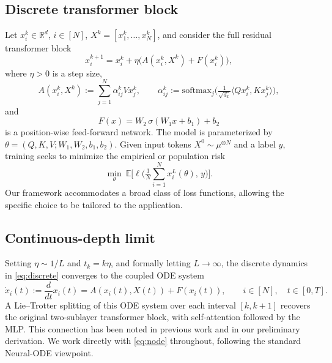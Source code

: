\documentclass[11pt,a4wide]{article}
\theoremstyle{definition}
\newcommand{\R}{\mathbb{R}}
\begin{document}
\subsection{Discrete transformer block}
Let $x_i^k\in\R^d$, $i\in[N]$, $X^k = [x_1^k,\dots,x_N^k]$, and consider the full residual transformer block
\begin{equation}
x_i^{k+1} = x_i^k + \eta\big(A(x_i^k,X^k) + F(x_i^k)\big),
\label{eq:discrete}
\end{equation}
where $\eta>0$ is a step size,
\begin{equation}
A(x_i^k,X^k) := \sum_{j=1}^N \alpha_{ij}^k V x_j^k, \qquad
\alpha_{ij}^k := \mathrm{softmax}_j\Big(\tfrac{1}{\sqrt{d_k}}\langle Qx_i^k, Kx_j^k\rangle\Big),
\label{eq:attn-discrete}
\end{equation}
and
\begin{equation}
F(x) = W_2\,\sigma(W_1 x + b_1) + b_2
\label{eq:ffn}
\end{equation}
is a position-wise feed-forward network. The model is parameterized by $\theta = (Q,K,V;W_1,W_2,b_1,b_2)$. Given input tokens $X^0\sim\mu^{\otimes N}$ and a label $y$, training seeks to minimize the empirical or population risk
\begin{equation}
\min_\theta\ \mathbb E\Big[\ell\Big(\tfrac1N\textstyle\sum_{i=1}^N x_i^L(\theta),\,y\Big)\Big].
\label{eq:pop-risk}
\end{equation}
Our framework accommodates a broad class of loss functions, allowing the specific choice to be tailored to the application. 

\subsection{Continuous-depth limit}
Setting $\eta\sim 1/L$ and $t_k = k\eta$, and formally letting $L\to\infty$, the discrete dynamics  in \eqref{eq:discrete} converges to the coupled ODE system
\begin{equation}
\dot x_i(t):=\frac{d}{dt}x_i(t) = A(x_i(t),X(t)) + F(x_i(t)), \qquad i\in[N], \quad t\in[0,T].
\label{eq:node}
\end{equation}
A Lie--Trotter splitting of this ODE system over each interval $[k, k+1]$ recovers the original two-sublayer transformer block, with self-attention followed by  the MLP.  This connection has been noted in previous work and in our preliminary derivation. We work directly with \eqref{eq:node} throughout, following the standard Neural-ODE viewpoint.  
\end{document}
